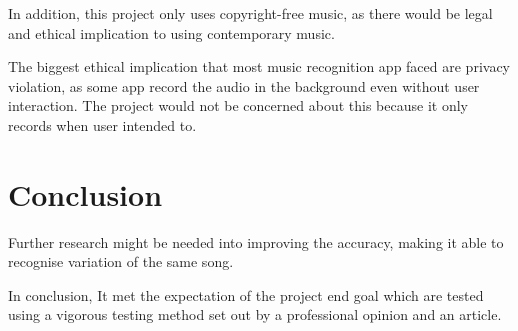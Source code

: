 In addition, this project only uses copyright-free music, as there would be legal and ethical implication to using contemporary music.

The biggest ethical implication that most music recognition app faced are privacy violation, as some app record the audio in the background even without user interaction. The project would not be concerned about this because it only records when user intended to.

\chapter{Conclusion}

Further research might be needed into improving the accuracy, making it able to recognise variation of the same song. \cite{yang_music_2001}

In conclusion, It met the expectation of the project end goal which are tested using a vigorous testing method set out by a professional opinion and an article. 
